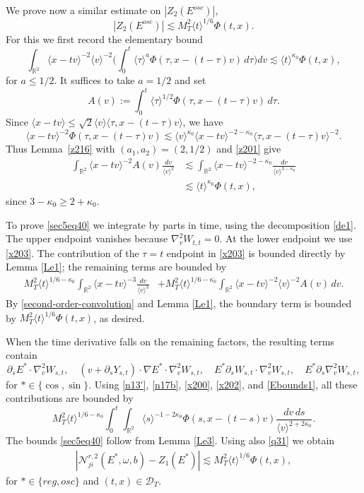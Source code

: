 \documentclass[reqno,11pt]{amsart}
\numberwithin{equation}{section}
\def\R{{\mathbb R}}
\def\R{{\bf R}}
\def\R{\mathbb{R}}
\begin{document}
We prove now a similar estimate on $|Z_2(E^{osc})|$, 
\begin{equation}\label{sec5eq40}
|Z_2(E^{osc})|\lesssim M_T^2\langle t\rangle^{1/6}\Phi(t,x).
\end{equation}
For this we first record the elementary bound
\begin{equation}\label{second-order-convolution}
\int_{\mathbb R^2}\langle x-tv\rangle^{-2}\langle v\rangle^{-2}
\Big(\int_0^t\langle\tau\rangle^a
\Phi(\tau,x-(t-\tau)v)\,d\tau\Big)dv\lesssim\langle t\rangle^{\kappa_0}\Phi(t,x),
\end{equation}
for $a\leq 1/2$.
\begingroup
It suffices to take $a=1/2$ and set
\[
A(v):=\int_0^t\langle\tau\rangle^{1/2}\Phi(\tau,x-(t-\tau)v)\,d\tau.
\]
Since $\langle x-tv\rangle\leq\sqrt2\langle v\rangle
\langle\tau,x-(t-\tau)v\rangle$, we have
\[
\langle x-tv\rangle^{-2}\Phi(\tau,x-(t-\tau)v)
\lesssim\langle v\rangle^{\kappa_0}\langle x-tv\rangle^{-2-\kappa_0}
\langle\tau,x-(t-\tau)v\rangle^{-2}.
\]
Thus Lemma~\ref{z216} with $(a_1,a_2)=(2,1/2)$ and \eqref{z201} give
\begin{align*}
\int_{\mathbb R^2}\langle x-tv\rangle^{-2}A(v)\frac{dv}{\langle v\rangle^2}
&\lesssim\int_{\mathbb R^2}\langle x-tv\rangle^{-2-\kappa_0}
\frac{dv}{\langle v\rangle^{3-\kappa_0}}\\
&\lesssim\langle t\rangle^{\kappa_0}\Phi(t,x),
\end{align*}
since $3-\kappa_0\geq2+\kappa_0$.
\endgroup

To prove \eqref{sec5eq40} we integrate by parts in time, using the decomposition \eqref{de1}. The upper
endpoint vanishes because $\nabla_v^2W_{t,t}=0$. At the lower endpoint we use
\eqref{x203}. The contribution of
the $\tau=t$ endpoint in \eqref{x203} is bounded directly by Lemma \ref{Le1};
the remaining terms are bounded by
\begin{align*}
M_T^2\langle t\rangle^{1/6-\kappa_0}
\int_{\R^2}\langle x-tv\rangle^{-3}\frac{dv}{\langle v\rangle^3}
&+M_T^2\langle t\rangle^{1/6-\kappa_0}
\int_{\R^2}\langle x-tv\rangle^{-2}\langle v\rangle^{-2}A(v)\,dv.
\end{align*}
By \eqref{second-order-convolution} and Lemma \ref{Le1}, the boundary term is
bounded by $M_T^2\langle t\rangle^{1/6}\Phi(t,x)$, as desired.

When the time derivative falls on the remaining factors, the resulting terms
contain 
\[
\partial_sE^*\cdot \nabla_v^2W_{s,t},\quad(v+\partial_sY_{s,t})\cdot\nabla E^*\cdot \nabla_v^2W_{s,t},\quad E^*\partial_sW_{s,t}\cdot \nabla_v^2W_{s,t},\quad E^*\partial_s\nabla_v^2W_{s,t},
\]
for $*\in\{\cos,\sin\}$. Using \eqref{n13'}, \eqref{n17b},
\eqref{x200}, \eqref{x202}, and \eqref{Ebounds1}, all these contributions are
bounded by
\[
M_T^2\langle t\rangle^{1/6-\kappa_0}
\int_0^t\!\!\int_{\R^2}
\langle s\rangle^{-1-2\kappa_0}
\Phi(s,x-(t-s)v)\frac{dv\,ds}{\langle v\rangle^{2+2\kappa_0}}.
\]
The bounds \eqref{sec5eq40} follow from Lemma \ref{Le3}. Using also \eqref{q31} we obtain
\begin{align}\label{q36}
\left|\mathcal N_{ji}^{r,2}(E^*,\omega,b)-Z_1(E^*)\right|
\lesssim M_T^2\langle t\rangle^{1/6}\Phi(t,x),
\end{align}
for $*\in\{reg,osc\}$ and $(t,x)\in\mathcal D_T$.
\end{document}
